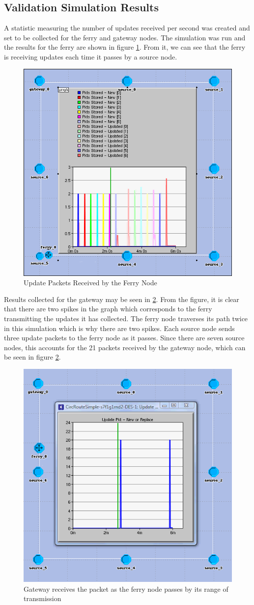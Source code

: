 \subsection{Validation Simulation Results}
\label{sec:results-validate}

A statistic measuring the number of updates received per second was created and set to be collected for the ferry and gateway nodes.
The simulation was run and the results for the ferry are shown in figure \ref{fig:result1-a}.  
From it, we can see that the ferry is receiving updates each time it passes by a source node. 

\begin{figure}[ht]
    \centering
    \includegraphics[width=.5\textwidth]{images/scenario1-result-received.png}
    \caption{Update Packets Received by the Ferry Node}
    \label{fig:result1-a}
\end{figure}

Results collected for the gateway may be seen in \ref{fig:result1-b}.
From the figure, it is clear that there are two spikes in the graph which corresponds to the ferry transmitting the updates it has collected. 
The ferry node traverses its path twice in this simulation which is why there are two spikes.
Each source node sends three update packets to the ferry node as it passes.  
Since there are seven source nodes, this accounts for the 21 packets received by the gateway node, which can be seen in figure \ref{fig:result1-b}.

\begin{figure}[ht]
    \centering
    \includegraphics[width=.5\textwidth]{images/scenario1-result-gateway.png}
    \caption{Gateway receives the packet as the ferry node passes by its range of transmission}
    \label{fig:result1-b}
\end{figure}


